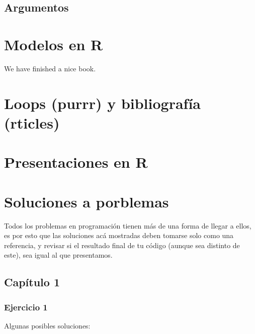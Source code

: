 \documentclass[]{book}
\newenvironment{Shaded}{\begin{snugshade}}{\end{snugshade}}
\newcommand{\KeywordTok}[1]{\textcolor[rgb]{0.13,0.29,0.53}{\textbf{#1}}}
\newcommand{\NormalTok}[1]{#1}
\newcommand{\OperatorTok}[1]{\textcolor[rgb]{0.81,0.36,0.00}{\textbf{#1}}}
\newcommand{\StringTok}[1]{\textcolor[rgb]{0.31,0.60,0.02}{#1}}
\begin{document}
\hypertarget{argumentos}{%
\section{Argumentos}\label{argumentos}}

\hypertarget{modelos}{%
\chapter{Modelos en R}\label{modelos}}

We have finished a nice book.

\hypertarget{loops}{%
\chapter{Loops (purrr) y bibliografía (rticles)}\label{loops}}

\hypertarget{presentacion}{%
\chapter{Presentaciones en R}\label{presentacion}}

\hypertarget{soluciones}{%
\chapter{Soluciones a porblemas}\label{soluciones}}

Todos los problemas en programación tienen más de una forma de llegar a
ellos, es por esto que las soluciones acá mostradas deben tomarse solo
como una referencia, y revisar si el resultado final de tu código
(aunque sea distinto de este), sea igual al que presentamos.

\hypertarget{capitulo-1}{%
\section{Capítulo 1}\label{capitulo-1}}

\hypertarget{ejercicio-1-1}{%
\subsection{Ejercicio 1}\label{ejercicio-1-1}}

Algunas posibles soluciones:

\begin{Shaded}
\end{Shaded}
\end{document}
